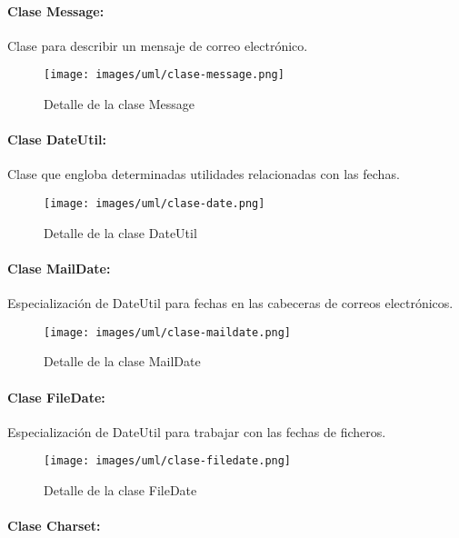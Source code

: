 \paragraph{Clase Message:}

Clase para describir un mensaje de correo electrónico.

\begin{figure}[H]
	\centering
 	\texttt{[image: images/uml/clase-message.png]}
	\caption{Detalle de la clase Message}
	\label{fig:uml:message-class}
\end{figure}

\paragraph{Clase DateUtil:}

Clase que engloba determinadas utilidades relacionadas con las fechas.

\begin{figure}[H]
	\centering
 	\texttt{[image: images/uml/clase-date.png]}
	\caption{Detalle de la clase DateUtil}
	\label{fig:uml:dateutil-class}
\end{figure}

\paragraph{Clase MailDate:}

Especialización de DateUtil para fechas en las cabeceras de correos electrónicos.

\begin{figure}[H]
	\centering
 	\texttt{[image: images/uml/clase-maildate.png]}
	\caption{Detalle de la clase MailDate}
	\label{fig:uml:maildate-class}
\end{figure}

\paragraph{Clase FileDate:}

Especialización de DateUtil para trabajar con las fechas de ficheros.

\begin{figure}[H]
	\centering
 	\texttt{[image: images/uml/clase-filedate.png]}
	\caption{Detalle de la clase FileDate}
	\label{fig:uml:filedate-class}
\end{figure}

\paragraph{Clase Charset:}

